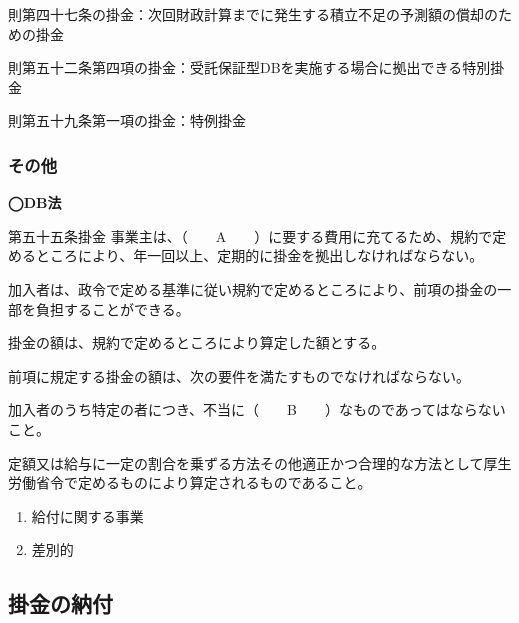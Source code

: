 \begin{explanationbox}
  則第四十七条の掛金：次回財政計算までに発生する積立不足の予測額の償却のための掛金

  則第五十二条第四項の掛金：受託保証型DBを実施する場合に拠出できる特別掛金

  則第五十九条第一項の掛金：特例掛金
\end{explanationbox}

\newpage

\subsubsection{その他}


\begin{fillblank}[数理人試験 H26 問題1(3)a,b]
  \noindent \textbf{◯DB法}
  \begin{lawstructure}
    \begin{lawarticle}{第五十五条}{掛金}
      事業主は、（　　A　　）に要する費用に充てるため、規約で定めるところにより、年一回以上、定期的に掛金を拠出しなければならない。

      加入者は、政令で定める基準に従い規約で定めるところにより、前項の掛金の一部を負担することができる。

      掛金の額は、規約で定めるところにより算定した額とする。

      前項に規定する掛金の額は、次の要件を満たすものでなければならない。

      加入者のうち特定の者につき、不当に（　　B　　）なものであってはならないこと。

      定額又は給与に一定の割合を乗ずる方法その他適正かつ合理的な方法として厚生労働省令で定めるものにより算定されるものであること。
    \end{lawarticle}
  \end{lawstructure}
\end{fillblank}

\begin{answerbox}
    \begin{enumerate}[A: ]
    \item 給付に関する事業
    \item 差別的
  \end{enumerate}
\end{answerbox}

\newpage

\subsection{掛金の納付}



